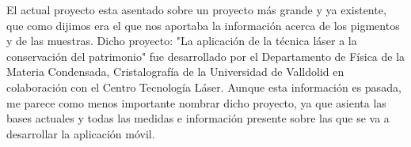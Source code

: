 El actual proyecto esta asentado sobre un proyecto más grande y ya existente, que como dijimos era el que nos aportaba la información acerca de los pigmentos y de las muestras. Dicho proyecto: "La aplicación de la técnica láser a la conservación del patrimonio" fue desarrollado por el Departamento de Física de la Materia Condensada, Cristalografía de la Universidad de Valldolid en colaboración con el Centro Tecnología Láser. Aunque esta información es pasada, me parece como menos importante nombrar dicho proyecto, ya que asienta las bases actuales y todas las medidas e información presente sobre las que se va a desarrollar la aplicación móvil.